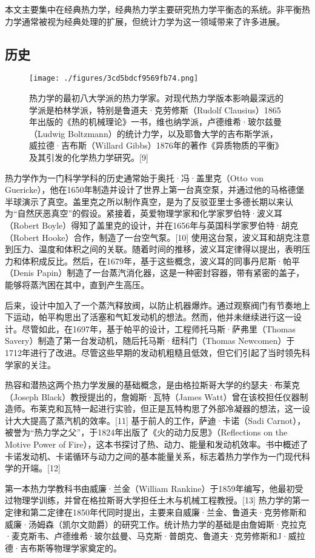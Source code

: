 本文主要集中在经典热力学，经典热力学主要研究热力学平衡态的系统。非平衡热力学通常被视为经典处理的扩展，但统计力学为这一领域带来了许多进展。
\subsection{历史}
\begin{figure}[ht]
\centering
\texttt{[image: ./figures/3cd5bdcf9569fb74.png]}
\caption{热力学的最初八大学派的热力学家。对现代热力学版本影响最深远的学派是柏林学派，特别是鲁道夫·克劳修斯（Rudolf Clausius）1865年出版的《热的机械理论》一书，维也纳学派，卢德维希·玻尔兹曼（Ludwig Boltzmann）的统计力学，以及耶鲁大学的吉布斯学派，威拉德·吉布斯（Willard Gibbs）1876年的著作《异质物质的平衡》及其引发的化学热力学研究。[9]} \label{fig_RLX_1}
\end{figure}
热力学作为一门科学学科的历史通常始于奥托·冯·盖里克（Otto von Guericke），他在1650年制造并设计了世界上第一台真空泵，并通过他的马格德堡半球演示了真空。盖里克之所以制作真空，是为了反驳亚里士多德长期以来认为“自然厌恶真空”的假设。紧接着，英爱物理学家和化学家罗伯特·波义耳（Robert Boyle）得知了盖里克的设计，并在1656年与英国科学家罗伯特·胡克（Robert Hooke）合作，制造了一台空气泵。[10] 使用这台泵，波义耳和胡克注意到压力、温度和体积之间的关联。随着时间的推移，波义耳定律得以提出，表明压力和体积成反比。然后，在1679年，基于这些概念，波义耳的同事丹尼斯·帕平（Denis Papin）制造了一台蒸汽消化器，这是一种密封容器，带有紧密的盖子，能够将蒸汽困在其中，直到产生高压。

后来，设计中加入了一个蒸汽释放阀，以防止机器爆炸。通过观察阀门有节奏地上下运动，帕平构思出了活塞和气缸发动机的想法。然而，他并未继续进行这一设计。尽管如此，在1697年，基于帕平的设计，工程师托马斯·萨弗里（Thomas Savery）制造了第一台发动机，随后托马斯·纽科门（Thomas Newcomen）于1712年进行了改进。尽管这些早期的发动机粗糙且低效，但它们引起了当时领先科学家的关注。

热容和潜热这两个热力学发展的基础概念，是由格拉斯哥大学的约瑟夫·布莱克（Joseph Black）教授提出的，詹姆斯·瓦特（James Watt）曾在该校担任仪器制造师。布莱克和瓦特一起进行实验，但正是瓦特构思了外部冷凝器的想法，这一设计大大提高了蒸汽机的效率。[11] 基于前人的工作，萨迪·卡诺（Sadi Carnot），被誉为“热力学之父”，于1824年出版了《火的动力反思》（Reflections on the Motive Power of Fire），这本书探讨了热、动力、能量和发动机效率。书中概述了卡诺发动机、卡诺循环与动力之间的基本能量关系，标志着热力学作为一门现代科学的开端。[12]

第一本热力学教科书由威廉·兰金（William Rankine）于1859年编写，他最初受过物理学训练，并曾在格拉斯哥大学担任土木与机械工程教授。[13] 热力学的第一定律和第二定律在1850年代同时提出，主要来自威廉·兰金、鲁道夫·克劳修斯和威廉·汤姆森（凯尔文勋爵）的研究工作。统计热力学的基础是由詹姆斯·克拉克·麦克斯韦、卢德维希·玻尔兹曼、马克斯·普朗克、鲁道夫·克劳修斯和J·威拉德·吉布斯等物理学家奠定的。

